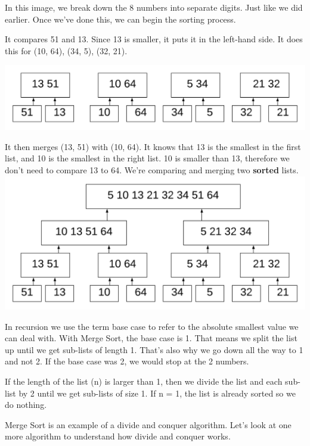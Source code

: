 \documentclass{article}
\begin{document}
In this image, we break down the 8 numbers into separate digits. Just like we did earlier. Once we've done this, we can begin the sorting process.

It compares 51 and 13. Since 13 is smaller, it puts it in the left-hand side. It does this for (10, 64), (34, 5), (32, 21).

\includegraphics[width=\textwidth,height=\textheight,keepaspectratio]{h.png}

It then merges (13, 51) with (10, 64). It knows that 13 is the smallest in the first list, and 10 is the smallest in the right list. 10 is smaller than 13, therefore we don't need to compare 13 to 64. We're comparing and merging two \textbf{sorted} lists.
\includegraphics[width=\textwidth,height=\textheight,keepaspectratio]{i.png}

In recursion we use the term base case to refer to the absolute smallest value we can deal with. With Merge Sort, the base case is 1. That means we split the list up until we get sub-lists of length 1. That's also why we go down all the way to 1 and not 2. If the base case was 2, we would stop at the 2 numbers.

If the length of the list (n) is larger than 1, then we divide the list and each sub-list by 2 until we get sub-lists of size 1. If n = 1, the list is already sorted so we do nothing.

Merge Sort is an example of a divide and conquer algorithm. Let's look at one more algorithm to understand how divide and conquer works.
\newpage
\end{document}
